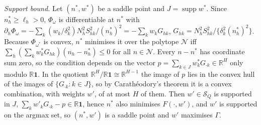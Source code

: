 \documentclass[pdflatex,sn-mathphys-num,iicol]{sn-jnl}
\theoremstyle{thmstyleone}
\theoremstyle{thmstyletwo}
\theoremstyle{thmstylethree}
\begin{document}
\emph{Support bound.} Let $(n^\ast,w^\ast)$ be a saddle point and $J=\operatorname{supp}w^\ast$. Since $n^\ast_h\ge\ell_h>0$, $\Phi_{\omega}$ is differentiable at $n^\ast$ with $\partial_h\Phi_\omega=-\sum_k(w_k/\delta_k^2)N_h^2S^2_{hk}/(n^\ast_h)^2=-\sum_kw_kG_{hk}$, $G_{hk}=N_h^2S^2_{hk}/\{\delta_k^2(n^\ast_h)^2\}$. Because $\Phi_{\omega^\ast}$ is convex, $n^\ast$ minimises it over the polytope $\mathcal N$ iff $\sum_h(\sum_kw^\ast_kG_{hk})(n_h-n^\ast_h)\le0$ for all $n\in\mathcal N$. Every $n-n^\ast$ has coordinate sum zero, so the condition depends on the vector $p=\sum_{k\in J}w^\ast_kG_{\cdot k}\in\mathbb R^H$ only modulo $\mathbb R\mathbf 1$. In the quotient $\mathbb R^H/\mathbb R\mathbf1\cong\mathbb R^{H-1}$ the image of $p$ lies in the convex hull of the images of $\{G_{\cdot k}:k\in J\}$, so by Carath\'eodory's theorem it is a convex combination, with weights $w'$, of at most $H$ of them. Then $w'\in\mathcal S_Q$ is supported in $J$, $\sum_kw'_kG_{\cdot k}-p\in\mathbb R\mathbf1$, hence $n^\ast$ also minimises $F(\cdot,w')$, and $w'$ is supported on the argmax set, so $(n^\ast,w')$ is a saddle point and $w'$ maximises $\Gamma$.
\end{document}
